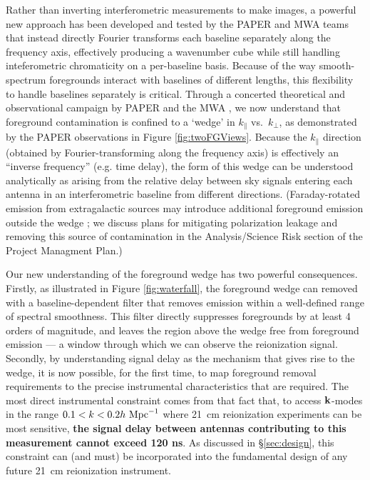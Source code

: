 \documentclass[preprint]{aastex}
\def\kperp{k_{\bot}}
\def\kpar{k_{\|}}
\def\kperp{k_{\bot}}
\def\kpar{k_{\|}}
\def\k{{\bf k}}
\begin{document}
Rather than inverting interferometric measurements to make images,
a powerful new approach has been developed and tested by the PAPER
and MWA teams that instead directly Fourier transforms each baseline separately along the frequency axis,
effectively producing a wavenumber cube while still handling inteferometric
chromaticity on a per-baseline basis.  Because of the way smooth-spectrum foregrounds
interact with baselines of different lengths, this flexibility to handle
baselines separately is critical.
Through a concerted theoretical and observational campaign by PAPER and the MWA
\citep{morales_et_al2012,parsons_et_al2012b,vedantham_2012,Datta_2010,hazelton_et_al2013,pober_et_al2013,parsons_et_al2013,dillon_et_al2013b},
we now understand that foreground contamination is confined to a `wedge' in
$\kpar$ vs.\ $\kperp$, as demonstrated by the PAPER observations in 
Figure \ref{fig:twoFGViews}. Because the $\kpar$ direction (obtained by
Fourier-transforming along the frequency axis) is effectively an ``inverse frequency'' (e.g. time delay),
the form of this wedge can be understood analytically as arising from the relative delay between sky signals
entering each antenna in an interferometric baseline from different directions.
(Faraday-rotated emission from extragalactic sources may introduce additional foreground emission outside the wedge \citep{moore_et_al2013};
we discuss plans for mitigating polarization leakage and removing this source
of contamination in the Analysis/Science Risk section of the Project Managment Plan.)

Our new understanding of the foreground wedge has two powerful consequences.
Firstly, as illustrated in Figure \ref{fig:waterfall}, the foreground wedge can
removed with a baseline-dependent filter that removes emission within a well-defined range of spectral smoothness.
This filter directly suppresses foregrounds by at least
4 orders of magnitude,  
and leaves the region above the wedge free from 
foreground emission --- a window through which we can observe the reionization signal.
Secondly, by understanding signal delay as the mechanism that gives rise to the wedge,
it is now possible, for the first time, to map foreground removal requirements 
to the precise instrumental characteristics that are required.  The most direct instrumental
constraint comes from that fact that, to access $\k$-modes in the range $0.1<k<0.2h\ {\rm Mpc}^{-1}$
where 21~cm reionization experiments can be most sensitive, {\bf the signal delay between antennas
contributing to this measurement cannot exceed 120 ns}.  As discussed in \S\ref{sec:design}, this
constraint can (and must) be incorporated into the fundamental design of any future 21~cm reionization instrument.
\end{document}
